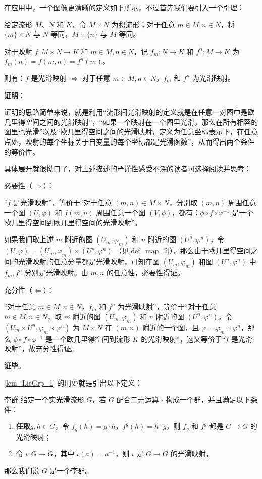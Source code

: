 在应用中，一个图像更清晰的定义如下所示，不过首先我们要引入一个引理：

\begin{lemma}{}\label{lem_LieGrp_1}
给定流形 $M$、$N$ 和 $K$，令 $M\times N$ 为积流形；对于任意 $m\in M, n\in N$，将 $\{m\}\times N$ 与 $N$ 等同，$M\times \{n\}$ 与 $M$ 等同。

对于映射 $f:M\times N\to K$ 和 $m\in M, n\in N$，记 $f_m:N\to K$ 和 $f^n:M\to K$ 为 $f_m(n)=f(m, n)=f^n(m)$。

则有：$f$ 是光滑映射 $\iff$ 对于任意 $m\in M, n\in N$，$f_m$ 和 $f^n$ 为光滑映射。
\end{lemma}

\textbf{证明}：

证明的思路简单来说，就是利用“流形间光滑映射的定义就是在任意一对图中是欧几里得空间之间的光滑映射”，“如果一个映射在一个图里光滑，那么在所有相容的图里也光滑”以及“欧几里得空间之间的光滑映射，定义为任意坐标表示下，在任意点处，映射的每个坐标关于自变量的每个坐标都是光滑函数”，从而得出两个条件的等价性。

具体展开就很拗口了，对上述描述的严谨性感受不深的读者可选择阅读并思考：

必要性（$\Rightarrow$）：

“$f$ 是光滑映射”，等价于“对于任意 $(m, n)\in M\times N$，分别取 $(m, n)$ 周围任意一个图 $(U, \varphi)$ 和 $f(m, n)$ 周围任意一个图 $(V, \phi)$，都有：$\phi\circ f\circ\varphi^{-1}$ 是一个欧几里得空间到欧几里得空间的光滑映射”。

如果我们取上述 $m$ 附近的图 $(U_m, \varphi_m)$ 和 $n$ 附近的图 $(U^n, \varphi^n)$，令 $(U, \varphi)=(U_m, \varphi_m)\times(U^n, \varphi^n)$ （见\autoref{def_map_2}），那么由于欧几里得空间之间的光滑映射的任意分量都是光滑映射，可知在图 $(U_m, \varphi_m)$ 和图 $(U^n, \varphi^n)$ 中 $f_m, f^n$ 分别是光滑映射。由 $m, n$ 的任意性，必要性得证。

充分性（$\Leftarrow$）：

“对于任意 $m\in M, n\in N$，$f_m$ 和 $f^n$ 为光滑映射”，等价于“对于任意 $m\in M, n\in N$，取 $m$ 附近的图 $(U_m, \varphi_m)$ 和 $n$ 附近的图 $(U^n, \varphi^n)$，令 $(U_m\times U^n, \varphi_m\times\varphi^n)$ 为 $M\times N$ 在 $(m, n)$ 附近的一个图，且 $\varphi=\varphi_m\times\varphi^n$，那么 $\phi\circ f\circ\varphi^{-1}$ 是一个欧几里得空间到流形 $K$ 的光滑映射”，这又等价于“$f$ 是光滑映射”，故充分性得证。

\textbf{证毕}。

\autoref{lem_LieGrp_1} 的用处就是引出以下定义：

\begin{definition}{李群}\label{def_LieGrp_4}
给定一个实光滑流形 $G$，若 $G$ 配合二元运算 $\cdot$ 构成一个群，并且满足以下条件：
\begin{enumerate}
\item \textbf{任取}$g, h\in G$，令 $f_g(h)=g\cdot h$，$f^g(h)=h\cdot g$，则 $f_g$ 和 $f^g$ 都是 $G\to G$ 的光滑映射；
\item 令 $\iota:G\to G$，其中 $\iota(a)=a^{-1}$，则 $\iota$ 是 $G\to G$ 的光滑映射，
\end{enumerate}
那么我们说 $G$ 是一个李群。
\end{definition}

